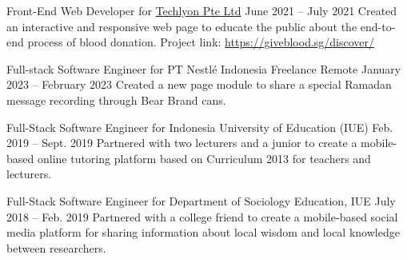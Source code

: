 \begin{cventries}

\cventry
{Front-End Web Developer for \href{https://helloakin.com/}{Techlyon Pte Ltd}} %
{} %
{} %
{June 2021 -- July 2021} %
{ %
Created an interactive and responsive web page to educate the public about the end-to-end process of blood donation.
\linebreak
Project link: \href{https://giveblood.sg/discover/}{https://giveblood.sg/discover/}
}


\cventry
{Full-stack Software Engineer for PT Nestlé Indonesia} %
{Freelance} %
{Remote} %
{January 2023 -- February 2023} %
{ %
Created a new page module to share a special Ramadan message recording through Bear Brand cans.
}




\cventry
{Full-Stack Software Engineer for Indonesia University of Education (IUE)} %
{} %
{} %
{Feb. 2019 -- Sept. 2019} %
{ %
Partnered with two lecturers and a junior to create a mobile-based online tutoring platform based on Curriculum 2013 for teachers and lecturers.
}


\cventry
{Full-Stack Software Engineer for Department of Sociology Education, IUE} %
{} %
{} %
{July 2018 -- Feb. 2019} %
{ %
Partnered with a college friend to create a mobile-based social media platform for sharing information about local wisdom and local knowledge between researchers.
}


\end{cventries}
